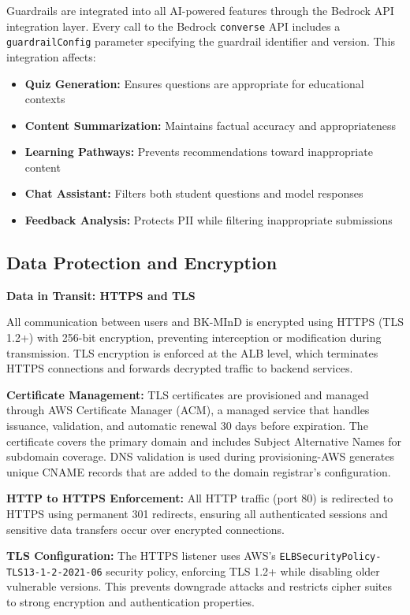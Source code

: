 Guardrails are integrated into all AI-powered features through the Bedrock API integration layer. Every call to the Bedrock \texttt{converse} API includes a \texttt{guardrailConfig} parameter specifying the guardrail identifier and version. This integration affects:

\begin{itemize}
    \item \textbf{Quiz Generation:} Ensures questions are appropriate for educational contexts
    \item \textbf{Content Summarization:} Maintains factual accuracy and appropriateness
    \item \textbf{Learning Pathways:} Prevents recommendations toward inappropriate content
    \item \textbf{Chat Assistant:} Filters both student questions and model responses
    \item \textbf{Feedback Analysis:} Protects PII while filtering inappropriate submissions
\end{itemize}


\subsection{Data Protection and Encryption}

\textbf{Data in Transit: HTTPS and TLS}

All communication between users and BK-MInD is encrypted using HTTPS (TLS 1.2+) with 256-bit encryption, preventing interception or modification during transmission. TLS encryption is enforced at the ALB level, which terminates HTTPS connections and forwards decrypted traffic to backend services.

\textbf{Certificate Management:} TLS certificates are provisioned and managed through AWS Certificate Manager (ACM), a managed service that handles issuance, validation, and automatic renewal 30 days before expiration. The certificate covers the primary domain and includes Subject Alternative Names for subdomain coverage. DNS validation is used during provisioning-AWS generates unique CNAME records that are added to the domain registrar's configuration.

\textbf{HTTP to HTTPS Enforcement:} All HTTP traffic (port 80) is redirected to HTTPS using permanent 301 redirects, ensuring all authenticated sessions and sensitive data transfers occur over encrypted connections.

\textbf{TLS Configuration:} The HTTPS listener uses AWS's \texttt{ELBSecurityPolicy-TLS13-1-2-2021-06} security policy, enforcing TLS 1.2+ while disabling older vulnerable versions. This prevents downgrade attacks and restricts cipher suites to strong encryption and authentication properties.

